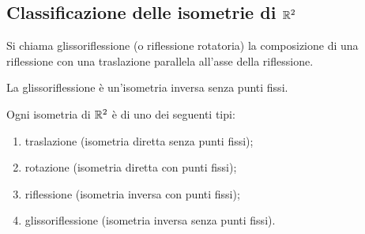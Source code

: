 	\subsection{Classificazione delle isometrie di $\mathbb R^2$}
 
 
 \begin{definition}[Glissoriflessione]
	Si chiama glissoriflessione (o riflessione rotatoria) la composizione di una riflessione con una traslazione parallela
	all'asse della riflessione.
 \end{definition}
 
 \begin{remark}
	La glissoriflessione è un'isometria inversa senza punti fissi.
 \end{remark}
 
 \begin{theorem}
 
Ogni isometria di $\mathbb R^2$ è di uno dei seguenti tipi:
 \begin{enumerate}[label=\bf\Roman*)]
  \item traslazione (isometria diretta senza punti fissi);
  \item rotazione (isometria diretta con punti fissi);
  \item riflessione (isometria inversa con punti fissi);
  \item glissoriflessione (isometria inversa senza punti fissi).
 \end{enumerate} 
 \end{theorem}
 
